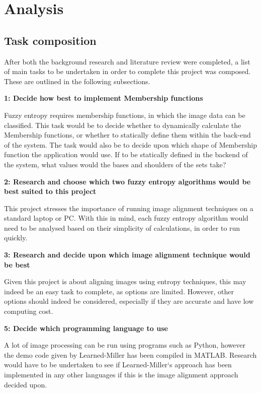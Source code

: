 \section{Analysis}

\subsection{Task composition}

After both the background research and literature review were completed, a list of main tasks to be undertaken in order to complete this project was composed. These are outlined in the following subsections.

\noindent \textbf{1: Decide how best to implement Membership functions}

Fuzzy entropy requires membership functions, in which the image data can be classified. This task would be to decide whether to dynamically calculate the Membership functions, or whether to statically define them within the back-end of the system. The task would also be to decide upon which shape of Membership function the application would use. If to be statically defined in the backend of the system, what values would the bases and shoulders of the sets take?

\noindent \textbf{2: Research and choose which two fuzzy entropy algorithms would be best suited to this project}

This project stresses the importance of running image alignment techniques on a standard laptop or PC. With this in mind, each fuzzy entropy algorithm would need to be analysed based on their simplicity of calculations, in order to run quickly.

\noindent \textbf{3: Research and decide upon which image alignment technique would be best}

Given this project is about aligning images using entropy techniques, this may indeed be an easy task to complete, as options are limited. However, other options should indeed be considered, especially if they are accurate and have low computing cost.

\noindent \textbf{5: Decide which programming language to use}

A lot of image processing can be run using programs such as Python, however the demo code given by Learned-Miller \cite{joint-alignment} has been compiled in MATLAB. Research would have to be undertaken to see if Learned-Miller`s approach has been implemented in any other languages if this is the image alignment approach decided upon.

